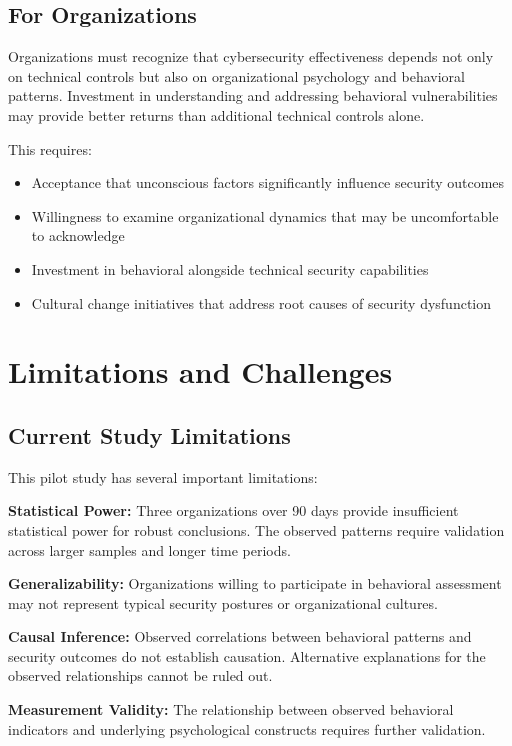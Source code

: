\documentclass[10pt, twocolumn]{article}
\begin{document}
\subsection{For Organizations}

Organizations must recognize that cybersecurity effectiveness depends not only on technical controls but also on organizational psychology and behavioral patterns. Investment in understanding and addressing behavioral vulnerabilities may provide better returns than additional technical controls alone.

This requires:
\begin{itemize}
\item Acceptance that unconscious factors significantly influence security outcomes
\item Willingness to examine organizational dynamics that may be uncomfortable to acknowledge
\item Investment in behavioral alongside technical security capabilities
\item Cultural change initiatives that address root causes of security dysfunction
\end{itemize}

\section{Limitations and Challenges}

\subsection{Current Study Limitations}

This pilot study has several important limitations:

\textbf{Statistical Power:} Three organizations over 90 days provide insufficient statistical power for robust conclusions. The observed patterns require validation across larger samples and longer time periods.

\textbf{Generalizability:} Organizations willing to participate in behavioral assessment may not represent typical security postures or organizational cultures.

\textbf{Causal Inference:} Observed correlations between behavioral patterns and security outcomes do not establish causation. Alternative explanations for the observed relationships cannot be ruled out.

\textbf{Measurement Validity:} The relationship between observed behavioral indicators and underlying psychological constructs requires further validation.
\end{document}
